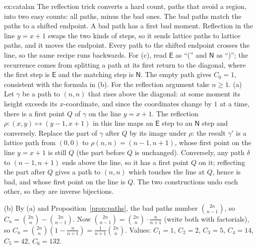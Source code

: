 \begin{solution}{ex:catalan}
\idea The reflection trick converts a hard count, paths that avoid a region, into two easy counts: all paths, minus the bad ones. The bad paths match the paths to a shifted endpoint. A bad path has a first bad moment. Reflection in the line $y=x+1$ swaps the two kinds of steps, so it sends lattice paths to lattice paths, and it moves the endpoint. Every path to the shifted endpoint crosses the line, so the same recipe runs backwards. For (c), read $\mathsf E$ as ``('' and $\mathsf N$ as ``)''; the recurrence comes from splitting a path at its first return to the diagonal, where the first step is $\mathsf E$ and the matching step is $\mathsf N$.
\writeup The empty path gives $C_0=1$, consistent with the formula in (b). For the reflection argument take $n\ge1$. (a) Let $\gamma$ be a path to $(n,n)$ that rises above the diagonal: at some moment its height exceeds its $x$-coordinate, and since the coordinates change by $1$ at a time, there is a first point $Q$ of $\gamma$ on the line $y=x+1$. The reflection $\rho:(x,y)\mapsto(y-1,x+1)$ in this line maps an $\mathsf E$ step to an $\mathsf N$ step and conversely. Replace the part of $\gamma$ after $Q$ by its image under $\rho$: the result $\gamma'$ is a lattice path from $(0,0)$ to $\rho(n,n)=(n-1,n+1)$, whose first point on the line $y=x+1$ is still $Q$ (the part before $Q$ is unchanged). Conversely, any path $\delta$ to $(n-1,n+1)$ ends above the line, so it has a first point $Q$ on it; reflecting the part after $Q$ gives a path to $(n,n)$ which touches the line at $Q$, hence is bad, and whose first point on the line is $Q$. The two constructions undo each other, so they are inverse bijections.

(b) By (a) and Proposition~\ref{prop:paths}, the bad paths number $\binom{2n}{n-1}$, so $C_n=\binom{2n}n-\binom{2n}{n-1}$. Now
$\binom{2n}{n-1}=\binom{2n}n\cdot\frac{n}{n+1}$ (write both with factorials), so $C_n=\binom{2n}n\left(1-\frac n{n+1}\right)=\frac1{n+1}\binom{2n}n$.
Values: $C_1=1$, $C_2=2$, $C_3=5$, $C_4=14$, $C_5=42$, $C_6=132$.


\end{solution}

